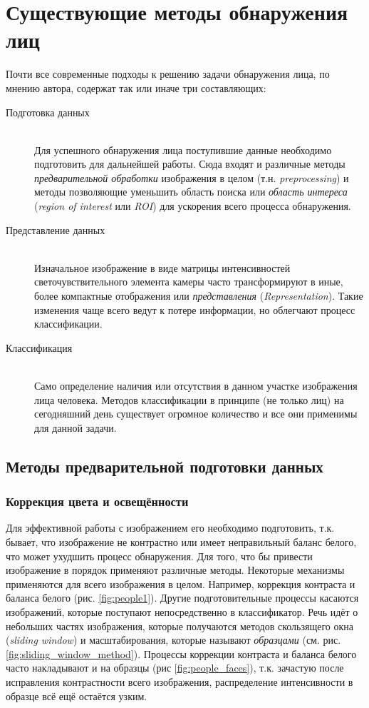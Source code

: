 \documentclass[12pt]{report}
\begin{document}
\section{Существующие методы обнаружения лиц}

Почти все современные подходы к решению задачи обнаружения лица, по мнению автора, содержат так или иначе три 
составляющих:

\begin{description}

\item[Подготовка данных]\hfill \\
	Для успешного обнаружения лица поступившие данные необходимо подготовить для дальнейшей работы. Сюда входят и 
различные методы \emph{предварительной обработки} изображения в целом (т.н. \textit{preprocessing}) и методы 
позволяющие уменьшить область поиска или \emph{область интереса} (\textit{region of interest} или \textit{ROI}) для 
ускорения всего процесса обнаружения.
\item[Представление данных]\hfill \\ 
	Изначальное изображение в виде матрицы интенсивностей светочувствительного элемента камеры часто трансформируют 
в 
иные, более компактные отображения или \emph{представления} (\textit{Representation}). Такие изменения чаще всего 
ведут к потере информации, но облегчают процесс классификации.
\item[Классификация]\hfill \\ 
	Само определение наличия или отсутствия в данном участке изображения лица человека. Методов классификации в 
принципе 
(не только лиц) на сегодняшний день существует огромное количество и все они применимы для данной задачи.
\end{description}

\subsection{Методы предварительной подготовки данных}
\subsubsection{Коррекция цвета и освещённости}
\label{sec:preprocessing_theor}
Для эффективной работы с изображением его необходимо подготовить, т.к. бывает, что изображение не контрастно или 
имеет неправильный баланс белого, что может ухудшить процесс обнаружения. Для того, что бы привести изображение в 
порядок применяют различные методы. Некоторые механизмы применяются для всего изображения в целом. Например, 
коррекция контраста и 
баланса белого (рис. \ref{fig:people1}). Другие подготовительные процессы касаются изображений, которые поступают 
непосредственно в классификатор. Речь идёт о небольших частях изображения, которые получаются методов скользящего 
окна (\textit{sliding window}) и масштабирования, которые называют \emph{образцами} %
 (см. рис. \ref{fig:sliding_window_method}). 
Процессы коррекции контраста и баланса белого часто накладывают и на образцы (рис \ref{fig:people_faces}), т.к. 
зачастую после исправления контрастности всего изображения, распределение интенсивности в образце всё ещё остаётся 
узким.
\end{document}
